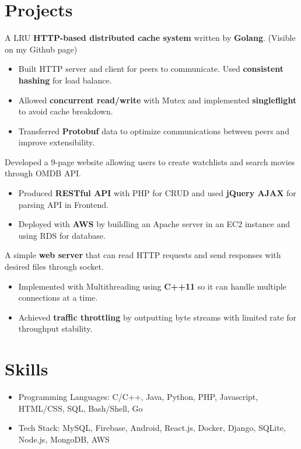 \documentclass{resume}
\begin{document}
\section{Projects}
 {}
  A LRU \textbf{HTTP-based distributed cache system} written by \textbf{Golang}. (Visible on my Github page)
\begin{itemize}
  \item Built HTTP server and client for peers to communicate. Used \textbf{consistent hashing} for load balance.
  \item Allowed \textbf{concurrent read/write} with Mutex and implemented \textbf{singleflight} to avoid cache breakdown.
  \item Transferred \textbf{Protobuf} data to optimize communications between peers and improve extensibility.
\end{itemize}

 {}
  Developed a 9-page website allowing users to create watchlists and search movies through OMDB API.
\begin{itemize}
  \item Produced \textbf{RESTful API} with PHP for CRUD and used \textbf{jQuery AJAX} for parsing API in Frontend.
  \item Deployed with \textbf{AWS} by buildling an Apache server in an EC2 instance and using RDS for database.
\end{itemize}

 {}
  A simple \textbf{web server} that can read HTTP requests and send responses with desired files through socket.
\begin{itemize}
  \item Implemented with Multithreading using \textbf{C++11} so it can handle multiple connections at a time.
  \item Achieved \textbf{traffic throttling} by outputting byte streams with limited rate for throughput stability.
\end{itemize}

\section{Skills}
\begin{itemize}[parsep=0.5ex]
  \item Programming Languages: C/C++, Java, Python, PHP, Javascript, HTML/CSS, SQL, Bash/Shell, Go
  \item Tech Stack: MySQL, Firebase, Android, React.js, Docker, Django, SQLite, Node.js, MongoDB, AWS
\end{itemize}
\end{document}
